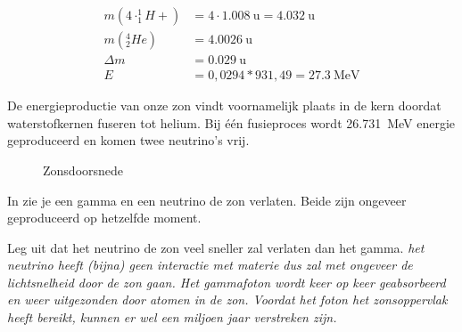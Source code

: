 \begin{opdrachten}
\begin{opdrachten}
    \begin{align*}
     m( 4 \cdot ^1_1H+) &=  4 \cdot \SI{1.008}{\atomicmassunit} = \SI{4.032}{\atomicmassunit}\\
     m(^4_2He) &= \SI{4.0026}{\atomicmassunit} \\
     \Delta m &= \SI{0.029}{\atomicmassunit}\\
     E &= 0,0294 * 931,49 =  \SI{27.3}{\mega\electronvolt}
    \end{align*}
    
    \end{opdrachten} 


\item De energieproductie van onze zon vindt voornamelijk plaats in de kern doordat 
waterstofkernen fuseren tot helium. Bij één fusieproces wordt 
\SI{26.731}{\mega\electronvolt} energie geproduceerd en komen twee neutrino's vrij. 

\begin{figure}
\centering
{}
\caption{Zonsdoorsnede} 
\label{fig:Zonsdoorsnede}
\end{figure}

In  zie je een gamma en een neutrino de zon 
verlaten. Beide zijn ongeveer geproduceerd op hetzelfde moment. \\
    \begin{opdrachten} 
    \item Leg uit dat het neutrino de zon veel
    sneller zal verlaten dan het gamma. 
    \textit{het neutrino heeft
    (bijna) geen interactie met materie dus zal met ongeveer de
    lichtsnelheid door de zon gaan. Het gammafoton wordt keer op keer geabsorbeerd en
    weer uitgezonden door atomen in de zon. Voordat het foton het zonsoppervlak heeft bereikt,
    kunnen er wel een miljoen jaar verstreken zijn.}
    

\end{opdrachten}
\end{opdrachten}
